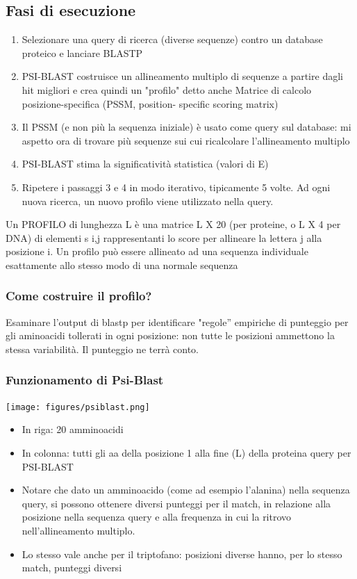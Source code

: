 \documentclass{article}
\begin{document}
\subsection{Fasi di esecuzione}
\begin{enumerate}
    \item Selezionare una query di ricerca (diverse sequenze) contro
    un database proteico e lanciare BLASTP
    \item PSI-BLAST costruisce un allineamento multiplo di sequenze
    a partire dagli hit migliori e crea quindi un "profilo" detto anche
    Matrice di calcolo posizione-specifica (PSSM, position-
    specific scoring matrix)
    \item Il PSSM (e non più la sequenza iniziale) è usato come query
    sul database: mi aspetto ora di trovare più sequenze sui cui
    ricalcolare l'allineamento multiplo
    \item PSI-BLAST stima la significatività statistica (valori di E)
    \item Ripetere i passaggi 3 e 4 in modo iterativo, tipicamente 5
    volte. Ad ogni nuova ricerca, un nuovo profilo viene utilizzato nella
    query.
\end{enumerate}
Un PROFILO di lunghezza L è una matrice L X 20 (per
proteine, o L X 4 per DNA) di elementi s i,j rappresentanti lo
score per allineare la lettera j alla posizione i.
Un profilo può essere allineato ad una sequenza individuale
esattamente allo stesso modo di una normale sequenza
\subsubsection{Come costruire il profilo?} Esaminare l'output di blastp per identificare "regole”
empiriche di punteggio per gli aminoacidi tollerati in ogni
posizione: non tutte le posizioni ammettono la stessa
variabilità. Il punteggio ne terrà conto.
\subsubsection{Funzionamento di Psi-Blast}
\begin{center}
    \texttt{[image: figures/psiblast.png]}
\end{center}
\begin{itemize}
    \item In riga: 20 amminoacidi
    \item In colonna: tutti gli aa della posizione 1 alla fine (L) della proteina query per PSI-BLAST
    \item Notare che dato un amminoacido (come ad esempio l'alanina) nella sequenza query, si possono ottenere diversi punteggi per il match, in relazione alla posizione nella sequenza query e alla frequenza in cui la ritrovo nell'allineamento multiplo.
    \item Lo stesso vale anche per il triptofano: posizioni diverse hanno, per lo stesso match, punteggi diversi
\end{itemize}
\end{document}
